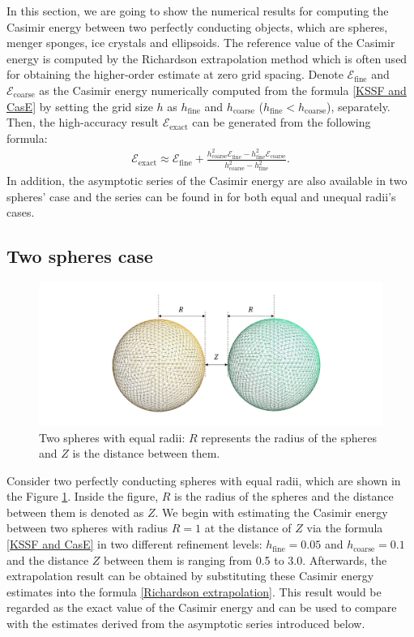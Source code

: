 In this section, we are going to show the numerical results for computing the Casimir energy between two perfectly conducting objects, which are spheres, 
menger sponges, ice crystals and ellipsoids. The reference value of the Casimir energy is computed by the Richardson extrapolation method which is often used 
for obtaining the higher-order estimate at zero grid spacing. Denote $\mathcal{E}_{\text{fine}}$ and $\mathcal{E}_{\text{coarse}}$ as the Casimir energy 
numerically computed from the formula \eqref{KSSF and CasE} by setting the grid size $h$ as $h_{\text{fine}}$ and $h_{\text{coarse}}$ 
($h_{\text{fine}}<h_{\text{coarse}}$), separately. Then, the high-accuracy result $\mathcal{E}_{\text{exact}}$ can be generated from the following formula:
\begin{align}\label{Richardson extrapolation}
    \mathcal{E}_{\text{exact}} \approx \mathcal{E}_{\text{fine}} + \frac{h_{\text{coarse}}^{2}\mathcal{E}_{\text{fine}} - h_{\text{fine}}^{2}\mathcal{E}_{\text{coarse}}}{h_{\text{coarse}}^{2} - h_{\text{fine}}^{2}}.
\end{align}
In addition, the asymptotic series of the Casimir energy are also available in two spheres' case and the series can be found in \cite{emig2008casimir} 
for both equal and unequal radii's cases. 

\subsection{Two spheres case}
\begin{figure}[H]
    \includegraphics[scale = 0.6]{figures/Grid_two_spheres_dist.png}
    \caption{Two spheres with equal radii: $R$ represents the radius of the spheres and $Z$ is the distance between them.}
    \label{Two spheres with equal radii}
\end{figure}

Consider two perfectly conducting spheres with equal radii, which are shown in the Figure \ref{Two spheres with equal radii}. Inside the figure, $R$ is the radius 
of the spheres and the distance between them is denoted as $Z$. We begin with estimating the Casimir energy between two spheres with radius $R = 1$ at the 
distance of $Z$ via the formula \eqref{KSSF and CasE} in two different refinement levels: $h_{\text{fine}} = 0.05$ and $h_{\text{coarse}} = 0.1$ and the 
distance $Z$ between them is ranging from 0.5 to 3.0. Afterwards, the extrapolation result can be obtained by substituting these Casimir energy estimates into 
the formula \eqref{Richardson extrapolation}. This result would be regarded as the exact value of the Casimir energy and can be used to compare with the 
estimates derived from the asymptotic series introduced below. 


